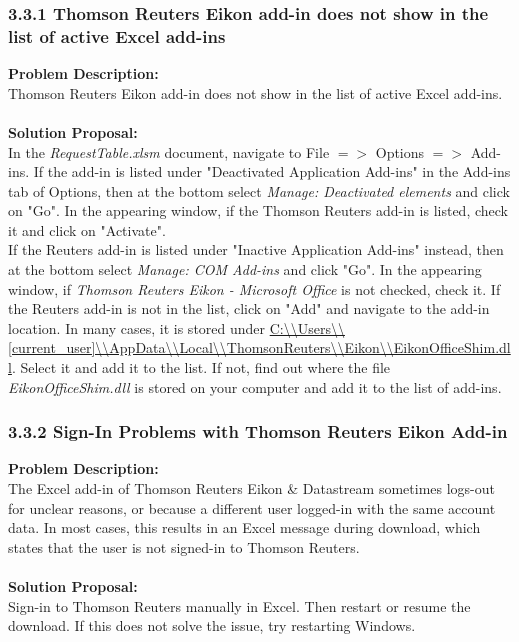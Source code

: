 \subsubsection{3.3.1 Thomson Reuters Eikon add-in does not show in the list of active Excel add-ins}
\textbf{Problem Description: }  \\
Thomson Reuters Eikon add-in does not show in the list of active Excel add-ins. \\ \\
\textbf{Solution Proposal:} \\
In the \textit{RequestTable.xlsm} document, navigate to File $ => $ Options $ => $ Add-ins. If the add-in is listed under "Deactivated Application Add-ins" in the Add-ins tab of Options, then at the bottom select \textit{Manage: Deactivated elements} and click on "Go". In the appearing window, if the Thomson Reuters add-in is listed, check it and click on "Activate". \\
If the Reuters add-in is listed under "Inactive Application Add-ins" instead, then at the bottom select \textit{Manage: COM Add-ins} and click "Go". In the appearing window, if \textit{Thomson Reuters Eikon - Microsoft Office} is not checked, check it. If the Reuters add-in is not in the list, click on "Add" and navigate to the add-in location. In many cases, it is stored under 
\url{C:\\Users\\[current_user]\\AppData\\Local\\ThomsonReuters\\Eikon\\EikonOfficeShim.dll}. 
Select it and add it to the list. If not, find out where the file \textit{EikonOfficeShim.dll} is stored on your computer and add it to the list of add-ins. 

\subsubsection{3.3.2 Sign-In Problems with Thomson Reuters Eikon Add-in}
\textbf{Problem Description: }  \\
The Excel add-in of Thomson Reuters Eikon \& Datastream sometimes logs-out for unclear reasons, or because a different user logged-in with the same account data. In most cases, this results in an Excel message during download, which states that the user is not signed-in to Thomson Reuters. \\ \\
\textbf{Solution Proposal:} \\
Sign-in to Thomson Reuters manually in Excel. Then restart or resume the download. If this does not solve the issue, try restarting Windows. 

